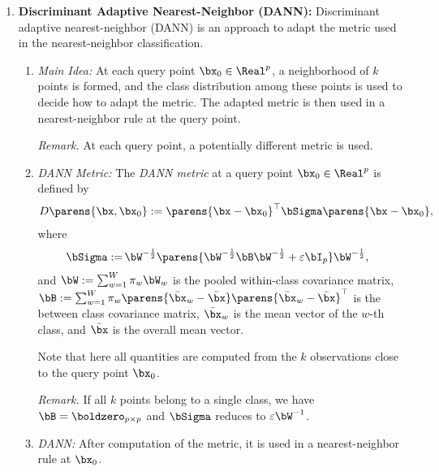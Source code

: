 \documentclass[12pt]{article}
\begin{document}
\begin{enumerate}[label=\textbf{\arabic*.}]
	\item \textbf{Discriminant Adaptive Nearest-Neighbor (DANN):} Discriminant adaptive nearest-neighbor (DANN) is an approach to adapt the metric used in the nearest-neighbor classification. 
	\begin{enumerate}
		\item \textit{Main Idea:} At each query point $\bx_0 \in \Real^p$, a neighborhood of $k$ points is formed, and the class distribution among these points is used to decide how to adapt the metric. The adapted metric is then used in a nearest-neighbor rule at the query point. 
		
		\textit{Remark.} At each query point, a potentially different metric is used. 
		\item \textit{DANN Metric:} The \emph{DANN metric} at a query point $\bx_0 \in \Real^p$ is defined by 
		\begin{align}
			D \parens{\bx, \bx_0} := \parens{\bx - \bx_0}^\top \bSigma \parens{\bx - \bx_0}, 
		\end{align}
		where 
		\begin{align*}
			\bSigma := & \, \bW^{-\frac{1}{2}} \parens{\bW^{-\frac{1}{2}} \bB \bW^{-\frac{1}{2}} + \varepsilon \bI_p} \bW^{-\frac{1}{2}}, 
		\end{align*}
		and 
		$\bW := \sum_{w=1}^W \pi_w \bW_w$ is the pooled within-class covariance matrix, $\bB := \sum_{w=1}^W \pi_w \parens{\bar{\bx}_w - \bar{\bx}} \parens{\bar{\bx}_w - \bar{\bx}}^\top$ is the between class covariance matrix, $\bar{\bx}_w$ is the mean vector of the $w$-th class, and $\bar{\bx}$ is the overall mean vector. 
		
		Note that here all quantities are computed from the $k$ observations close to the query point $\bx_0$. 
		
		\textit{Remark.} If all $k$ points belong to a single class, we have $\bB = \boldzero_{p \times p}$ and $\bSigma$ reduces to $\varepsilon \bW^{-1}$. 
		
		\item \textit{DANN:} After computation of the metric, it is used in a nearest-neighbor rule at $\bx_0$. 
		
	\end{enumerate}

\end{enumerate}

\printbibliography
\end{document}
